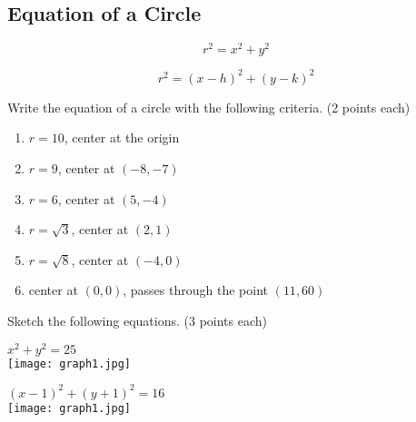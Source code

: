 \documentclass[12pt]{article}
\begin{document}
\pagebreak

\subsection*{Equation of a Circle}

$$r^2=x^2+y^2$$

$$r^2=(x-h)^2+(y-k)^2$$

Write the equation of a circle with the following criteria. (2 points each)\\

\begin{enumerate}[resume]

	\item $r=10$, center at the origin\\
	
	\item $r=9$, center at $(-8,-7)$\\
	
	\item $r=6$, center at $(5,-4)$\\
	
	\item $r=\sqrt{3}$, center at $(2,1)$\\
	
	\item $r=\sqrt{8}$, center at $(-4,0)$\\
	
	\item center at $(0,0)$, passes through the point $(11,60)$\\
	
	
\end{enumerate}

\hrulefill

Sketch the following equations. (3 points each)\\

\begin{enumerate}[resume]
\begin{multicols}{2}

	\item $x^2+y^2=25$\\
	
	\texttt{[image: graph1.jpg]}
	
	\item $(x-1)^2+(y+1)^2=16$\\
	
	\texttt{[image: graph1.jpg]}

\end{multicols}
\end{enumerate}
\end{document}

